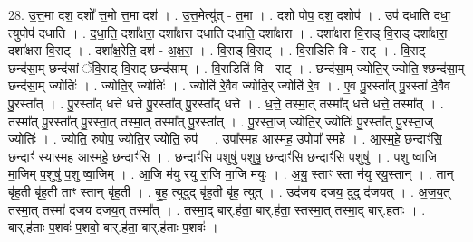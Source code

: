 \documentclass[17pt]{extarticle}
\begin{document}
28. उ॒त्त॒मा दश॒ दशो᳚ त्त॒मो त्त॒मा दश॑ । . उ॒त्त॒मेत्यु॑त् - त॒मा । . दशो पोप॒ दश॒ दशोप॑ । . उप॑ दधाति दधा॒ त्युपोप॑ दधाति । . द॒धा॒ति॒ दशा᳚क्षरा॒ दशा᳚क्षरा दधाति दधाति॒ दशा᳚क्षरा । . दशा᳚क्षरा वि॒राड् वि॒राड् दशा᳚क्षरा॒ दशा᳚क्षरा वि॒राट् । . दशा᳚क्ष॒रेति॒ दश॑ - अ॒क्ष॒रा॒ । . वि॒राड् वि॒राट् । . वि॒राडिति॑ वि - राट् । . वि॒राट् छन्द॑सा॒म् छन्द॑सां ॅवि॒राड् वि॒राट् छन्द॑साम् । . वि॒राडिति॑ वि - राट् । . छन्द॑सा॒म् ज्योति॒र् ज्योति॒ श्छन्द॑सा॒म् छन्द॑सा॒म् ज्योतिः॑ । . ज्योति॒र् ज्योतिः॑ । . ज्योति॑ रे॒वैव ज्योति॒र् ज्योति॑ रे॒व । . ए॒व पु॒रस्ता᳚त् पु॒रस्ता॑ दे॒वैव पु॒रस्ता᳚त् । . पु॒रस्ता᳚द् धत्ते धत्ते पु॒रस्ता᳚त् पु॒रस्ता᳚द् धत्ते । . ध॒त्ते॒ तस्मा॒त् तस्मा᳚द् धत्ते धत्ते॒ तस्मा᳚त् । . तस्मा᳚त् पु॒रस्ता᳚त् पु॒रस्ता॒त् तस्मा॒त् तस्मा᳚त् पु॒रस्ता᳚त् । . पु॒रस्ता॒ज् ज्योति॒र् ज्योतिः॑ पु॒रस्ता᳚त् पु॒रस्ता॒ज् ज्योतिः॑ । . ज्योति॒ रुपोप॒ ज्योति॒र् ज्योति॒ रुप॑ । . उपा᳚स्मह आस्मह॒ उपोपा᳚ स्महे । . आ॒स्म॒हे॒ छन्दाꣳ॑सि॒ छन्दाꣳ॑ स्यास्मह आस्महे॒ छन्दाꣳ॑सि । . छन्दाꣳ॑सि प॒शुषु॑ प॒शुषु॒ छन्दाꣳ॑सि॒ छन्दाꣳ॑सि प॒शुषु॑ । . प॒शु ष्वा॒जि मा॒जिम् प॒शुषु॑ प॒शु ष्वा॒जिम् । . आ॒जि म॑यु रयु रा॒जि मा॒जि म॑युः । . अ॒यु॒ स्ताꣳ स्ता न॑यु रयु॒स्तान् । . तान् बृ॑ह॒ती बृ॑ह॒ती ताꣳ स्तान् बृ॑ह॒ती । . बृ॒ह॒ त्युदुद् बृ॑ह॒ती बृ॑ह॒ त्युत् । . उद॑जय दजय॒ दुदु द॑जयत् । . अ॒ज॒य॒त् तस्मा॒त् तस्मा॑ दजय दजय॒त् तस्मा᳚त् । . तस्मा॒द् बार्.ह॑ता॒ बार्.ह॑ता॒ स्तस्मा॒त् तस्मा॒द् बार्.ह॑ताः । . बार्.ह॑ताः प॒शवः॑ प॒शवो॒ बार्.ह॑ता॒ बार्.ह॑ताः प॒शवः॑ । \newline
\end{document}
